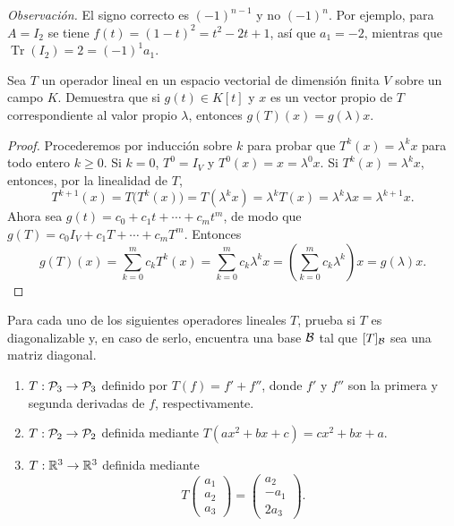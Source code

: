 \documentclass[12pt,a4paper]{article}
\renewcommand{\Tr}{\operatorname{Tr}}
\begin{document}
    \textit{Observación.} El signo correcto es $(-1)^{n-1}$ y no $(-1)^{n}$. Por ejemplo, para $A=I_{2}$ se tiene $f(t)=(1-t)^{2}=t^{2}-2t+1$, así que $a_{1}=-2$, mientras que $\Tr(I_{2})=2=(-1)^{1}a_{1}$.

    \begin{problema}
        Sea $T$ un operador lineal en un espacio vectorial de dimensión finita $V$ sobre un campo $K$. Demuestra que si $g(t)\in K[t]$ y $x$ es un vector propio de $T$ correspondiente al valor propio $\lambda$, entonces $g(T)(x)=g(\lambda)x$.
    \end{problema}

    \begin{proof}
        Procederemos por inducción sobre $k$ para probar que $T^{k}(x)=\lambda^{k}x$ para todo entero $k\geq0$. Si $k=0$, $T^{0}=I_{V}$ y $T^{0}(x)=x=\lambda^{0}x$. Si $T^{k}(x)=\lambda^{k}x$, entonces, por la linealidad de $T$,
        \begin{equation*}
            T^{k+1}(x)=T\big(T^{k}(x)\big)=T(\lambda^{k}x)=\lambda^{k}T(x)=\lambda^{k}\lambda x=\lambda^{k+1}x.
        \end{equation*}
        Ahora sea $g(t)=c_{0}+c_{1}t+\cdots+c_{m}t^{m}$, de modo que $g(T)=c_{0}I_{V}+c_{1}T+\cdots+c_{m}T^{m}$. Entonces
        \begin{equation*}
            g(T)(x)=\sum_{k=0}^{m}c_{k}T^{k}(x)=\sum_{k=0}^{m}c_{k}\lambda^{k}x=\left(\sum_{k=0}^{m}c_{k}\lambda^{k}\right)x=g(\lambda)x.
        \end{equation*}
    \end{proof}

    \begin{problema}
        Para cada uno de los siguientes operadores lineales $T$, prueba si $T$ es diagonalizable y, en caso de serlo, encuentra una base $\mathcal{B}$ tal que $[T]_{\mathcal{B}}$ sea una matriz diagonal.
        \begin{enumerate}[label=(\alph*)]
            \item $T:\mathcal{P}_{3}\to \mathcal{P}_{3}$ definido por $T(f)=f'+f''$, donde $f'$ y $f''$ son la primera y segunda derivadas de $f$, respectivamente.
            \item $T:\mathcal{P}_{2}\to \mathcal{P}_{2}$ definida mediante $T(ax^{2}+bx+c)=cx^{2}+bx+a$.
            \item $T:\mathbb{R}^{3}\to\mathbb{R}^{3}$ definida mediante
            \begin{equation*}
                T
                \begin{pmatrix}
                    a_{1}\\
                    a_{2}\\
                    a_{3}
                \end{pmatrix}
                =
                \begin{pmatrix}
                    a_{2}\\
                    -a_{1}\\
                    2a_{3}
                \end{pmatrix}.
            \end{equation*}
        \end{enumerate}
    \end{problema}
\end{document}
